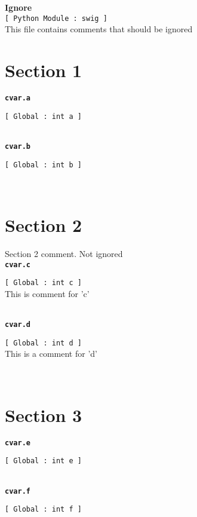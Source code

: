 \setlength{\parindent}{0.0in}
\setlength{\textwidth}{6.5in}
\setlength{\oddsidemargin}{0.0in}
\pagestyle{headings}

{\Large \bf  Ignore }\\
{\tt [ Python Module : swig ]  }\\
   This file contains comments that should be ignored   
\\\section{Section 1}{\tt \bf cvar.a }
\\
\makebox[0.5in]{}\begin{minipage}[t]{6in}
{\tt [ Global : int  a ]  }\\

\end{minipage}\\

{\tt \bf cvar.b }
\\
\makebox[0.5in]{}\begin{minipage}[t]{6in}
{\tt [ Global : int  b ]  }\\

\end{minipage}\\

\section{Section 2}   Section 2 comment.  Not ignored   
\\{\tt \bf cvar.c }
\\
\makebox[0.5in]{}\begin{minipage}[t]{6in}
{\tt [ Global : int  c ]  }\\
   This is comment for 'c'   
\\

\end{minipage}\\

{\tt \bf cvar.d }
\\
\makebox[0.5in]{}\begin{minipage}[t]{6in}
{\tt [ Global : int  d ]  }\\
   This is a comment for 'd'   
\\

\end{minipage}\\

\section{Section 3}{\tt \bf cvar.e }
\\
\makebox[0.5in]{}\begin{minipage}[t]{6in}
{\tt [ Global : int  e ]  }\\

\end{minipage}\\

{\tt \bf cvar.f }
\\
\makebox[0.5in]{}\begin{minipage}[t]{6in}
{\tt [ Global : int  f ]  }\\

\end{minipage}\\



